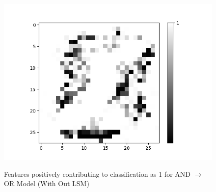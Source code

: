 \begin{figure}[H]
\begin{minipage}[t]{0.44\textwidth}
	\medskip

	\begin{minipage}[b]{0.5\textwidth}
		\captionsetup{labelformat=empty}
		\includegraphics[width=\textwidth]{AND-OR(WO-LSM)(1)/Like/False/Layer0-Neuron-3.png}
		\label{}
	\end{minipage}
	\caption{Features positively contributing to classification as 1 for AND $\rightarrow$ OR Model (With Out LSM)}
	\end{minipage}

	\hfill
\end{figure}

